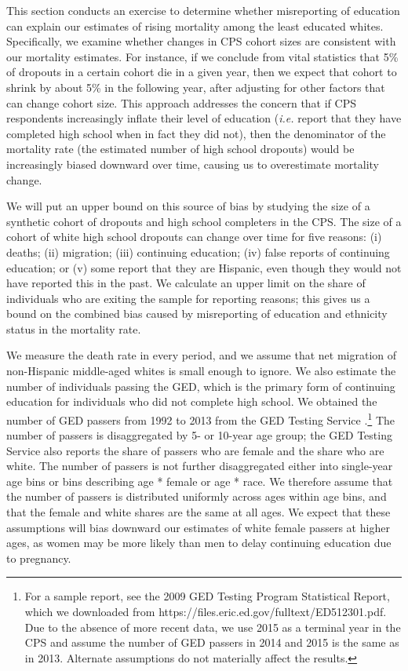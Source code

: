 This section conducts an exercise to determine whether misreporting of education can explain our estimates of rising mortality among the least educated whites. Specifically, we examine whether changes in CPS cohort sizes are consistent with our mortality estimates. For instance, if we conclude from vital statistics that 5\% of dropouts in a certain cohort die in a given year, then we expect that cohort to shrink by about 5\% in the following year, after adjusting for other factors that can change cohort size. This approach addresses the concern that if CPS respondents increasingly inflate their level of education (\textit{i.e.} report that they have completed high school when in fact they did not), then the denominator of the mortality rate (the estimated number of high school dropouts) would be increasingly biased downward over time, causing us to overestimate mortality change.

We will put an upper bound on this source of bias by studying the size of a synthetic cohort of dropouts and high school completers in the CPS. The size of a cohort of white high school dropouts can change over time for five reasons: (i) deaths; (ii) migration; (iii) continuing education; (iv) false reports of continuing education; or (v) some report that they are Hispanic, even though they would not have reported this in the past.  We calculate an upper limit on the share of individuals who are exiting the sample for reporting reasons; this gives us a bound on the combined bias caused by misreporting of education and ethnicity status in the mortality rate.

We measure the death rate in every period, and we assume that net migration of non-Hispanic middle-aged whites is small enough to ignore. We also estimate the number of individuals passing the GED, which is the primary form of continuing education for individuals who did not complete high school. We obtained the number of GED passers from 1992 to 2013 from the GED Testing Service \citep{ged}.\footnote{For a sample report, see the 2009 GED Testing Program Statistical Report, which we downloaded from https://files.eric.ed.gov/fulltext/ED512301.pdf. Due to the absence of more recent data, we use 2015 as a terminal year in the CPS and assume the number of GED passers in 2014 and 2015 is the same as in 2013. Alternate assumptions do not materially affect the results.} The number of passers is disaggregated by 5- or 10-year age group; the GED Testing Service also reports the share of passers who are female and the share who are white. The number of passers is not further disaggregated either into single-year age bins or bins describing age * female or age * race. We therefore assume that the number of passers is distributed uniformly across ages within age bins, and that the female and white shares are the same at all ages. We expect that these assumptions will bias downward our estimates of white female passers at higher ages, as women may be more likely than men to delay continuing education due to pregnancy.

